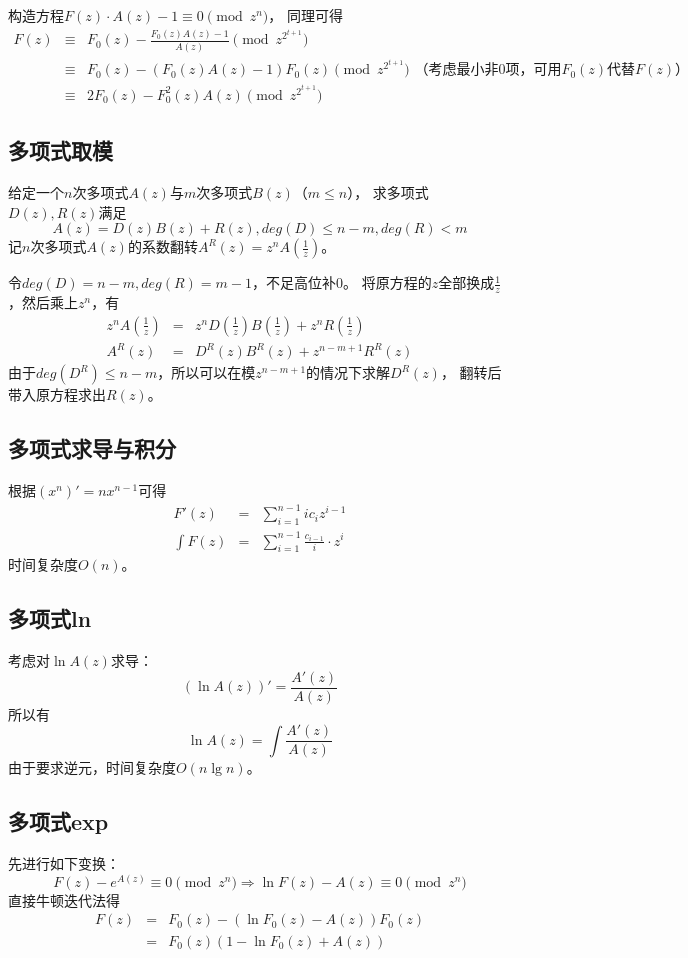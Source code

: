 构造方程$F(z)\cdot A(z)-1\equiv 0\pmod{z^n}$，
同理可得
\begin{eqnarray*}
    F(z)&\equiv& F_0(z)-\frac{F_0(z)A(z)-1}{A(z)} \pmod{z^{2^{t+1}}}\\
    &\equiv& F_0(z)-(F_0(z) A(z)-1){F_0(z)} \pmod{z^{2^{t+1}}}
    \textrm{~（考虑最小非0项，可用$F_0(z)$代替$F(z)$）}\\
    &\equiv& 2F_0(z)-F_0^2(z)A(z) \pmod{z^{2^{t+1}}}
\end{eqnarray*}
\subsection{多项式取模}
给定一个$n$次多项式$A(z)$与$m$次多项式$B(z)$（$m\leq n$），
求多项式$D(z),R(z)$满足
\begin{displaymath}
    A(z)=D(z)B(z)+R(z),deg(D)\leq n-m,deg(R)<m
\end{displaymath}
记$n$次多项式$A(z)$的系数翻转$A^R(z)=z^nA(\frac{1}{z})$。

令$deg(D)=n-m,deg(R)=m-1$，不足高位补0。
将原方程的$z$全部换成$\frac{1}{z}$，然后乘上$z^n$，有
\begin{eqnarray*}
    z^nA(\frac{1}{z})&=&z^nD(\frac{1}{z})B(\frac{1}{z})+z^nR(\frac{1}{z})\\
    A^R(z)&=&D^R(z)B^R(z)+z^{n-m+1}R^R(z)
\end{eqnarray*}
由于$deg(D^R)\leq n-m$，所以可以在模$z^{n-m+1}$的情况下求解$D^R(z)$，
翻转后带入原方程求出$R(z)$。

\subsection{多项式求导与积分}
根据$(x^n)'=nx^{n-1}$可得
\begin{eqnarray*}
    F'(z)&=&\sum_{i=1}^{n-1}{ic_iz^{i-1}}\\
    \int F(z)&=&\sum_{i=1}^{n-1}{\frac{c_{i-1}}{i}\cdot z^i}
\end{eqnarray*}
时间复杂度$O(n)$。
\subsection{多项式ln}
考虑对$\ln A(z)$求导：
\begin{displaymath}
    (\ln A(z))'=\frac{A'(z)}{A(z)}
\end{displaymath}
所以有
\begin{displaymath}
    \ln A(z)=\int \frac{A'(z)}{A(z)}
\end{displaymath}
由于要求逆元，时间复杂度$O(n \lg n)$。
\subsection{多项式exp}
先进行如下变换：
\begin{displaymath}
    F(z)-e^{A(z)}\equiv 0 \pmod{z^n}
    \Rightarrow \ln F(z)-A(z)\equiv 0 \pmod{z^n}
\end{displaymath}
直接牛顿迭代法得
\begin{eqnarray*}
    F(z)&=&F_0(z)-(\ln F_0(z)-A(z))F_0(z)\\
    &=&F_0(z)(1-\ln F_0(z)+A(z))
\end{eqnarray*}
